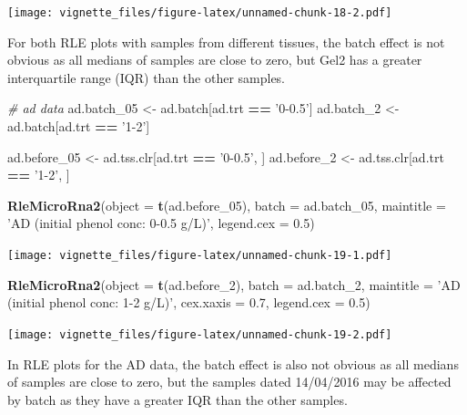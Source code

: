 \documentclass[]{book}
\newenvironment{Shaded}{\begin{snugshade}}{\end{snugshade}}
\newcommand{\KeywordTok}[1]{\textcolor[rgb]{0.13,0.29,0.53}{\textbf{#1}}}
\newcommand{\DataTypeTok}[1]{\textcolor[rgb]{0.13,0.29,0.53}{#1}}
\newcommand{\DecValTok}[1]{\textcolor[rgb]{0.00,0.00,0.81}{#1}}
\newcommand{\FloatTok}[1]{\textcolor[rgb]{0.00,0.00,0.81}{#1}}
\newcommand{\StringTok}[1]{\textcolor[rgb]{0.31,0.60,0.02}{#1}}
\newcommand{\CommentTok}[1]{\textcolor[rgb]{0.56,0.35,0.01}{\textit{#1}}}
\newcommand{\OperatorTok}[1]{\textcolor[rgb]{0.81,0.36,0.00}{\textbf{#1}}}
\newcommand{\NormalTok}[1]{#1}
\begin{document}
\texttt{[image: vignette\_files/figure-latex/unnamed-chunk-18-2.pdf]}

For both RLE plots with samples from different tissues, the batch effect
is not obvious as all medians of samples are close to zero, but Gel2 has
a greater interquartile range (IQR) than the other samples.

\begin{Shaded}
\begin{Highlighting}[]
\CommentTok{# ad data}
\NormalTok{ad.batch_}\DecValTok{05}\NormalTok{ <-}\StringTok{ }\NormalTok{ad.batch[ad.trt }\OperatorTok{==}\StringTok{ '0-0.5'}\NormalTok{]}
\NormalTok{ad.batch_}\DecValTok{2}\NormalTok{ <-}\StringTok{ }\NormalTok{ad.batch[ad.trt }\OperatorTok{==}\StringTok{ '1-2'}\NormalTok{] }

\NormalTok{ad.before_}\DecValTok{05}\NormalTok{ <-}\StringTok{ }\NormalTok{ad.tss.clr[ad.trt }\OperatorTok{==}\StringTok{ '0-0.5'}\NormalTok{, ]}
\NormalTok{ad.before_}\DecValTok{2}\NormalTok{ <-}\StringTok{ }\NormalTok{ad.tss.clr[ad.trt }\OperatorTok{==}\StringTok{ '1-2'}\NormalTok{, ]}

\KeywordTok{RleMicroRna2}\NormalTok{(}\DataTypeTok{object =} \KeywordTok{t}\NormalTok{(ad.before_}\DecValTok{05}\NormalTok{), }\DataTypeTok{batch =}\NormalTok{ ad.batch_}\DecValTok{05}\NormalTok{, }
             \DataTypeTok{maintitle =} \StringTok{'AD (initial phenol conc: 0-0.5 g/L)'}\NormalTok{, }
             \DataTypeTok{legend.cex =} \FloatTok{0.5}\NormalTok{)}
\end{Highlighting}
\end{Shaded}

\texttt{[image: vignette\_files/figure-latex/unnamed-chunk-19-1.pdf]}

\begin{Shaded}
\begin{Highlighting}[]
\KeywordTok{RleMicroRna2}\NormalTok{(}\DataTypeTok{object =} \KeywordTok{t}\NormalTok{(ad.before_}\DecValTok{2}\NormalTok{), }\DataTypeTok{batch =}\NormalTok{ ad.batch_}\DecValTok{2}\NormalTok{, }
             \DataTypeTok{maintitle =} \StringTok{'AD (initial phenol conc: 1-2 g/L)'}\NormalTok{, }
             \DataTypeTok{cex.xaxis =} \FloatTok{0.7}\NormalTok{, }\DataTypeTok{legend.cex =} \FloatTok{0.5}\NormalTok{)}
\end{Highlighting}
\end{Shaded}

\texttt{[image: vignette\_files/figure-latex/unnamed-chunk-19-2.pdf]}

In RLE plots for the AD data, the batch effect is also not obvious as
all medians of samples are close to zero, but the samples dated
14/04/2016 may be affected by batch as they have a greater IQR than the
other samples.
\end{document}
